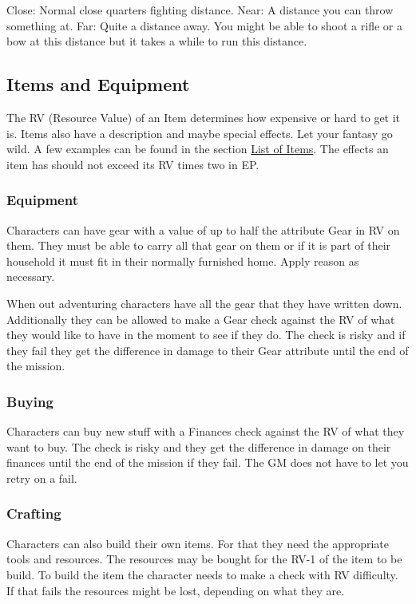 \documentclass[11pt]{article}
\begin{document}
{\begin{multicols}{2}[]
Close: Normal close quarters fighting distance.
Near: A distance you can throw something at.
Far: Quite a distance away. You might be able to shoot a rifle or a bow at this distance but it takes a while to run this distance.

\subsection{Items and Equipment}
\label{sec:org5dbc204}

The RV (Resource Value) of an Item determines how expensive or hard to get it is. Items also have a description and maybe special effects. Let your fantasy go wild. A few examples can be found in the section \hyperref[sec:orga1df5a2]{List of Items}. The effects an item has should not exceed its RV times two in EP.

\subsubsection{Equipment}
\label{sec:orgeacd562}
Characters can have gear with a value of up to half the attribute Gear in RV on them. They must be able to carry all that gear on them or if it is part of their household it must fit in their normally furnished home. Apply reason as necessary.

When out adventuring characters have all the gear that they have written down. Additionally they can be allowed to make a Gear check against the RV of what they would like to have in the moment to see if they do. The check is risky and if they fail they get the difference in damage to their Gear attribute until the end of the mission.

\subsubsection{Buying}
\label{sec:org73bbe85}
Characters can buy new stuff with a Finances check against the RV of what they want to buy. The check is risky and they get the difference in damage on their finances until the end of the mission if they fail. The GM does not have to let you retry on a fail.

\subsubsection{Crafting}
\label{sec:orgcc60924}
Characters can also build their own items. For that they need the appropriate tools and resources. The resources may be bought for the RV-1 of the item to be build. To build the item the character needs to make a check with RV difficulty. If that fails the resources might be lost, depending on what they are.


\end{multicols}}
\end{document}
